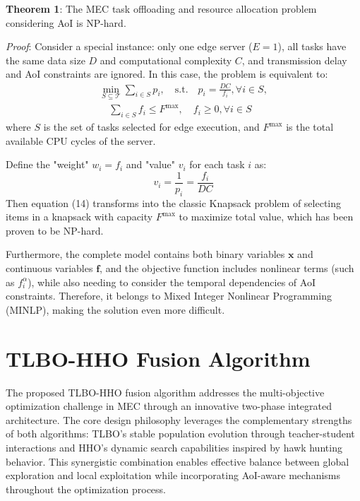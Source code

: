 \documentclass[conference]{IEEEtran}
\begin{document}
\textbf{Theorem 1}: The MEC task offloading and resource allocation problem considering AoI is NP-hard.

\textit{Proof}: Consider a special instance: only one edge server ($E = 1$), all tasks have the same data size $D$ and computational complexity $C$, and transmission delay and AoI constraints are ignored. In this case, the problem is equivalent to:
\begin{equation}
    \begin{split}
        \min_{S \subseteq \mathcal{T}} \sum_{i \in S} p_i, \quad
        \text{s.t.} \quad p_i = \frac{DC}{f_i}, \forall i \in S, \\
        \quad
        \sum_{i \in S} f_i \leq F^{\max}, \quad
        f_i \geq 0, \forall i \in S
    \end{split}
\end{equation}
where $S$ is the set of tasks selected for edge execution, and $F^{\max}$ is the total available CPU cycles of the server.

Define the "weight" $w_i = f_i$ and "value" $v_i$ for each task $i$ as:
\begin{equation}
v_i = \frac{1}{p_i} = \frac{f_i}{DC}
\end{equation}
Then equation (14) transforms into the classic Knapsack problem of selecting items in a knapsack with capacity $F^{\max}$ to maximize total value, which has been proven to be NP-hard.

Furthermore, the complete model contains both binary variables $\mathbf{x}$ and continuous variables $\mathbf{f}$, and the objective function includes nonlinear terms (such as $f_i^{\alpha}$), while also needing to consider the temporal dependencies of AoI constraints. Therefore, it belongs to Mixed Integer Nonlinear Programming (MINLP), making the solution even more difficult.

\section{TLBO-HHO Fusion Algorithm}

The proposed TLBO-HHO fusion algorithm addresses the multi-objective optimization challenge in MEC through an innovative two-phase integrated architecture. The core design philosophy leverages the complementary strengths of both algorithms: TLBO's stable population evolution through teacher-student interactions and HHO's dynamic search capabilities inspired by hawk hunting behavior. This synergistic combination enables effective balance between global exploration and local exploitation while incorporating AoI-aware mechanisms throughout the optimization process.
\end{document}
